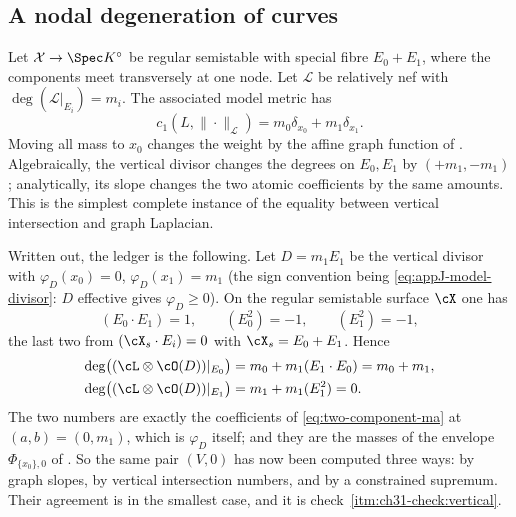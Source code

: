 \subsection{A nodal degeneration of curves}
\label{sec:ch31-nodal}

Let \(\mathcal X\to\Spec K^\circ\) be regular semistable with special fibre
\(E_0+E_1\), where the components meet transversely at one node.  Let
\(\mathcal L\) be relatively nef with
\(\deg(\mathcal L|_{E_i})=m_i\).  The associated model metric has
\begin{equation}
                   c_1(L,\|\cdot\|_{\mathcal L})
                   =m_0\delta_{x_0}+m_1\delta_{x_1}.
\label{eq:nodal-reference-measure}
\end{equation}
Moving all mass to \(x_0\) changes the weight by the affine graph function
of .  Algebraically, the vertical
divisor changes the degrees on \(E_0,E_1\) by \((+m_1,-m_1)\); analytically,
its slope changes the two atomic coefficients by the same amounts.  This is
the simplest complete instance of the equality between vertical
intersection and graph Laplacian.

Written out, the ledger is the following.  Let
\(D=m_1E_1\) be the vertical divisor with \(\varphi_D(x_0)=0\),
\(\varphi_D(x_1)=m_1\) (the sign convention being
\eqref{eq:appJ-model-divisor}: \(D\) effective gives
\(\varphi_D\geq0\)).  On the regular semistable surface \(\cX\) one has
\[
 (E_0\cdot E_1)=1,\qquad
 (E_0^2)=-1,\qquad (E_1^2)=-1,
\]
the last two from \((\cX_s\cdot E_i)=0\) with \(\cX_s=E_0+E_1\).  Hence
\begin{equation}
\label{eq:ch31-nodal-ledger}
 \begin{aligned}
 \deg\bigl((\cL\otimes\cO(D))|_{E_0}\bigr)
  &=m_0+m_1(E_1\cdot E_0)=m_0+m_1,\\
 \deg\bigl((\cL\otimes\cO(D))|_{E_1}\bigr)
  &=m_1+m_1(E_1^2)=0 .
 \end{aligned}
\end{equation}
The two numbers are exactly the coefficients of
\eqref{eq:two-component-ma} at \((a,b)=(0,m_1)\), which is
\(\varphi_D\) itself; and they are the masses of the envelope
\(\Phi_{\{x_0\},0}\) of .  So the same pair
\((V,0)\) has now been computed three ways: by graph slopes, by vertical
intersection numbers, and by a constrained supremum.  Their agreement is
 in the smallest case, and it is
check~\cref{itm:ch31-check:vertical}.

